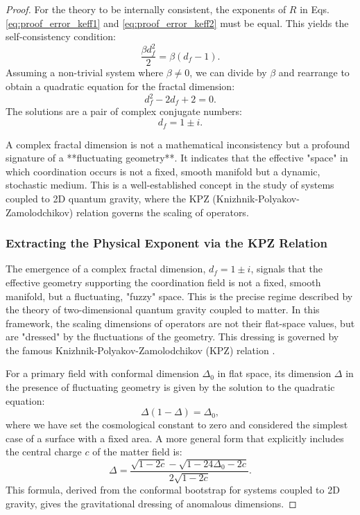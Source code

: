 \documentclass[12pt,a4paper]{article}
\begin{document}
\begin{proof}
		For the theory to be internally consistent, the exponents of \(R\) in Eqs. \eqref{eq:proof_error_keff1} and \eqref{eq:proof_error_keff2} must be equal. This yields the self-consistency condition:
		\begin{equation}
			\frac{\beta d_f^2}{2} = \beta(d_f - 1).
		\end{equation}
		Assuming a non-trivial system where \(\beta \neq 0\), we can divide by \(\beta\) and rearrange to obtain a quadratic equation for the fractal dimension:
		\begin{equation}
			d_f^2 - 2d_f + 2 = 0.
			\label{eq:df_quadratic}
		\end{equation}
		The solutions are a pair of complex conjugate numbers:
		\begin{equation}
			d_f = 1 \pm i.
			\label{eq:df_complex}
		\end{equation}
		
		A complex fractal dimension is not a mathematical inconsistency but a profound signature of a **fluctuating geometry**. It indicates that the effective "space" in which coordination occurs is not a fixed, smooth manifold but a dynamic, stochastic medium. This is a well-established concept in the study of systems coupled to 2D quantum gravity, where the KPZ (Knizhnik-Polyakov-Zamolodchikov) relation governs the scaling of operators.
		
		\subsubsection{Extracting the Physical Exponent via the KPZ Relation}
		
		The emergence of a complex fractal dimension, \(d_f = 1 \pm i\), signals that the effective geometry supporting the coordination field is not a fixed, smooth manifold, but a fluctuating, "fuzzy" space. This is the precise regime described by the theory of two-dimensional quantum gravity coupled to matter. In this framework, the scaling dimensions of operators are not their flat-space values, but are "dressed" by the fluctuations of the geometry. This dressing is governed by the famous Knizhnik-Polyakov-Zamolodchikov (KPZ) relation \cite{Knizhnik1988}.
		
		For a primary field with conformal dimension \(\Delta_0\) in flat space, its dimension \(\Delta\) in the presence of fluctuating geometry is given by the solution to the quadratic equation:
		\begin{equation}
			\Delta(1 - \Delta) = \Delta_0,
			\label{eq:kpz_simple}
		\end{equation}
		where we have set the cosmological constant to zero and considered the simplest case of a surface with a fixed area. A more general form that explicitly includes the central charge \(c\) of the matter field is:
		\begin{equation}
			\Delta = \frac{\sqrt{1 - 2c} - \sqrt{1 - 24\Delta_0 - 2c}}{2\sqrt{1 - 2c}}.
			\label{eq:kpz_general}
		\end{equation}
		This formula, derived from the conformal bootstrap for systems coupled to 2D gravity, gives the gravitational dressing of anomalous dimensions.
		

\end{proof}
\end{document}
